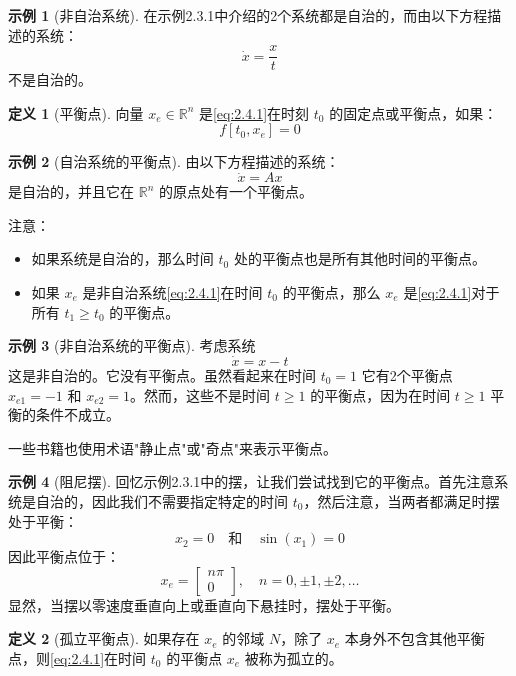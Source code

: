 \documentclass[UTF8,12pt,a4paper]{ctexart}
\theoremstyle{definition}
\newtheorem{definition}{定义}[section]
\newtheorem{example}{示例}[section]
\begin{document}
\begin{example}[非自治系统]
在示例2.3.1中介绍的2个系统都是自治的，而由以下方程描述的系统：
\[
\dot{x} = \frac{x}{t}
\]
不是自治的。
\end{example}

\begin{definition}[平衡点]
向量 $x_e \in \mathbb{R}^n$ 是\eqref{eq:2.4.1}在时刻 $t_0$ 的固定点或平衡点，如果：
\[
f[t_0, x_e] = 0
\]
\end{definition}

\begin{example}[自治系统的平衡点]
由以下方程描述的系统：
\[
\dot{x} = Ax
\]
是自治的，并且它在 $\mathbb{R}^n$ 的原点处有一个平衡点。
\end{example}

注意：
\begin{itemize}
\item 如果系统是自治的，那么时间 $t_0$ 处的平衡点也是所有其他时间的平衡点。
\item 如果 $x_e$ 是非自治系统\eqref{eq:2.4.1}在时间 $t_0$ 的平衡点，那么 $x_e$ 是\eqref{eq:2.4.1}对于所有 $t_1 \geq t_0$ 的平衡点。
\end{itemize}

\begin{example}[非自治系统的平衡点]
考虑系统
\[
\dot{x} = x - t
\]
这是非自治的。它没有平衡点。虽然看起来在时间 $t_0=1$ 它有2个平衡点 $x_{e1}=-1$ 和 $x_{e2}=1$。然而，这些不是时间 $t \geq 1$ 的平衡点，因为在时间 $t \geq 1$ 平衡的条件不成立。
\end{example}

一些书籍也使用术语"静止点"或"奇点"来表示平衡点。

\begin{example}[阻尼摆]
回忆示例2.3.1中的摆，让我们尝试找到它的平衡点。首先注意系统是自治的，因此我们不需要指定特定的时间 $t_0$，然后注意，当两者都满足时摆处于平衡：
\[
x_2 = 0 \quad \text{和} \quad \sin(x_1) = 0
\]
因此平衡点位于：
\[
x_e = \begin{bmatrix} n\pi \\ 0 \end{bmatrix}, \quad n = 0, \pm 1, \pm 2, \ldots
\]
显然，当摆以零速度垂直向上或垂直向下悬挂时，摆处于平衡。
\end{example}

\begin{definition}[孤立平衡点]
如果存在 $x_e$ 的邻域 $N$，除了 $x_e$ 本身外不包含其他平衡点，则\eqref{eq:2.4.1}在时间 $t_0$ 的平衡点 $x_e$ 被称为孤立的。
\end{definition}
\end{document}
